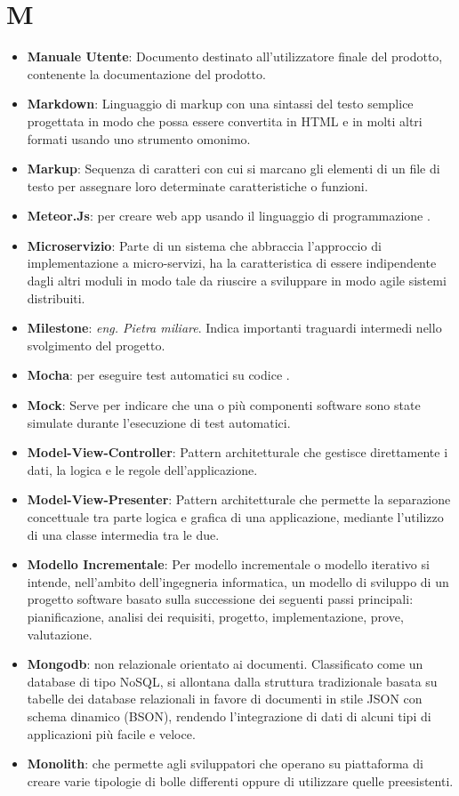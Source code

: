 \section*{M}
\begin{itemize}
	\item
	\textbf{Manuale Utente}: Documento destinato all'utilizzatore finale del prodotto, contenente la documentazione del prodotto.
	\item
	\textbf{Markdown}: Linguaggio di markup con una sintassi del testo semplice progettata in modo che possa essere convertita in HTML e in molti altri formati usando uno strumento omonimo.
	\item
	\textbf{Markup}: Sequenza di caratteri con cui si marcano gli elementi di un file di testo per assegnare loro determinate caratteristiche o funzioni.
	\item
	\textbf{Meteor.Js}:  per creare web app usando il linguaggio di programmazione .
	\item
	\textbf{Microservizio}: Parte di un sistema che abbraccia l'approccio di implementazione a micro-servizi, ha la caratteristica di essere indipendente dagli altri moduli in modo tale da riuscire a sviluppare in modo agile sistemi distribuiti.
	\item
	\textbf{Milestone}: \textit{eng. Pietra miliare}. Indica importanti traguardi intermedi nello svolgimento del progetto.
	\item
	\textbf{Mocha}:  per eseguire test automatici su codice .
	\item
	\textbf{Mock}: Serve per indicare che una o più componenti software sono state simulate durante l'esecuzione di test automatici.
	\item
	\textbf{Model-View-Controller}: Pattern architetturale che gestisce direttamente i dati, la logica e le regole dell'applicazione.
	\item
	\textbf{Model-View-Presenter}: Pattern architetturale che permette la separazione concettuale tra parte logica e grafica di una applicazione, mediante l'utilizzo di una classe intermedia tra le due.
	\item
	\textbf{Modello Incrementale}: Per modello incrementale o modello iterativo si intende, nell'ambito dell'ingegneria informatica, un modello di sviluppo di un progetto software basato sulla successione dei seguenti passi principali: pianificazione, analisi dei requisiti, progetto, implementazione, prove, valutazione.
	\item
	\textbf{Mongodb}:  non relazionale orientato ai documenti. Classificato come un database di tipo NoSQL,  si allontana dalla struttura tradizionale basata su tabelle dei database relazionali in favore di documenti in stile JSON con schema dinamico (BSON), rendendo l'integrazione di dati di alcuni tipi di applicazioni più facile e veloce.
	\item
	\textbf{Monolith}:  che permette agli sviluppatori che operano su piattaforma  di creare varie tipologie di bolle differenti oppure di utilizzare quelle preesistenti.
\end{itemize}
\newpage